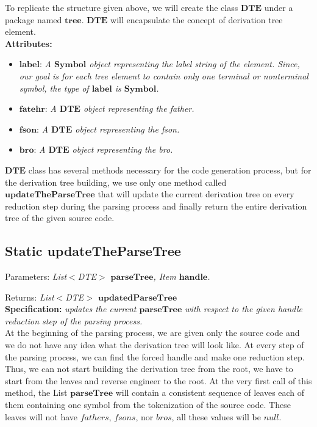 To replicate the structure given above, we will create the class \(\boldsymbol{DTE}\) under a package named \(\boldsymbol{tree}\). \(\boldsymbol{DTE}\) will encapsulate the concept of derivation tree element.\\

\textbf{Attributes:}
\begin{itemize}
    \item \(\boldsymbol{label}\): \textit{A \(\boldsymbol{Symbol}\) object representing the label string of the element. Since, our goal is for each tree element to contain only one terminal or nonterminal symbol, the type of \(\boldsymbol{label}\) is \(\boldsymbol{Symbol}\).}
    \item \(\boldsymbol{fatehr}\): \textit{A \(\boldsymbol{DTE}\) object representing the father.}
    \item \(\boldsymbol{fson}\): \textit{A \(\boldsymbol{DTE}\) object representing the fson.}
    \item \(\boldsymbol{bro}\): \textit{A \(\boldsymbol{DTE}\) object representing the bro.}
\end{itemize}

\(\boldsymbol{DTE}\) class has several methods necessary for the code generation process, but for the derivation tree building, we use only one method called \(\boldsymbol{updateTheParseTree}\) that will update the current derivation tree on every reduction step during the parsing process and finally return the entire derivation tree of the given source code.

\vspace{10pt}

\subsection{Static updateTheParseTree}

Parameters: \textit{List\(<\)DTE\(>\) \(\boldsymbol{parseTree}\), Item \(\boldsymbol{handle}\).}

Returns: \textit{List\(<\)DTE\(>\) \(\boldsymbol{updatedParseTree}\)}\\

\textbf{Specification:} \textit{updates the current \(\boldsymbol{parseTree}\) with respect to the given handle reduction step of the parsing process.}\\

At the beginning of the parsing process, we are given only the source code and we do not have any idea what the derivation tree will look like. At every step of the parsing process, we can find the forced handle and make one reduction step. Thus, we can not start building the derivation tree from the root, we have to start from the leaves and reverse engineer to the root. At the very first call of this method, the List \(\boldsymbol{parseTree}\) will contain a consistent sequence of leaves each of them containing one symbol from the tokenization of the source code. These leaves will not have \(fathers\), \(fsons\), nor \(bros\), all these values will be \(null\).\\

